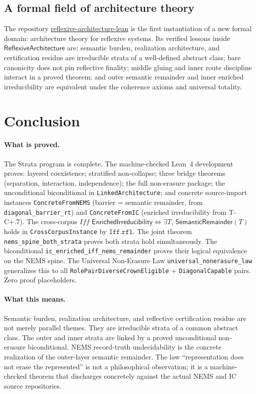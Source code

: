 \documentclass[11pt]{article}
\newcommand{\SemRem}{\ensuremath{\mathsf{SemanticRemainder}}}
\newcommand{\RAL}{\ensuremath{\mathsf{ReflexiveArchitecture}}}
\newcommand{\EnrIrr}{\ensuremath{\mathsf{EnrichedIrreducibility}}}
\begin{document}
\subsection{A formal field of architecture theory}

The repository \url{reflexive-architecture-lean} is the first instantiation of a new
formal domain: architecture theory for reflexive systems.  Its verified lessons inside
$\RAL$ are: semantic burden, realization architecture, and certification residue are
irreducible strata of a well-defined abstract class; bare canonicity does not pin
reflective finality; middle gluing and inner route discipline interact in a proved
theorem; and outer semantic remainder and inner enriched irreducibility are equivalent
under the coherence axioms and universal totality.

\section{Conclusion}
\label{sec:conclusion}

\paragraph{What is proved.}
The Strata program is complete.  The machine-checked Lean~4 development proves:
layered coexistence; stratified non-collapse; three bridge theorems (separation,
interaction, independence); the full non-erasure package; the unconditional
biconditional in \texttt{LinkedArchitecture}; and concrete source-import instances
\texttt{ConcreteFromNEMS} (barrier = semantic remainder, from \texttt{diagonal\_barrier\_rt})
and \texttt{ConcreteFromIC} (enriched irreducibility from T-C+.7).
The cross-corpus $\mathit{Iff}$
$\EnrIrr \iff \exists T,\,\SemRem(T)$
holds in \texttt{CrossCorpusInstance} by $\mathtt{Iff.rfl}$.
The joint theorem \texttt{nems\_spine\_both\_strata} proves both strata hold
simultaneously.  The biconditional \texttt{ic\_enriched\_iff\_nems\_remainder} proves
their logical equivalence on the NEMS spine.  The Universal Non-Erasure Law
\texttt{universal\_nonerasure\_law} generalizes this to all
\texttt{RolePairDiverseCrownEligible} + \texttt{DiagonalCapable} pairs.
Zero proof placeholders.

\paragraph{What this means.}
Semantic burden, realization architecture, and reflective certification residue are not
merely parallel themes.  They are irreducible strata of a common abstract class.  The
outer and inner strata are linked by a proved unconditional non-erasure biconditional.
NEMS record-truth undecidability is the concrete realization of the outer-layer semantic
remainder.  The law ``representation does not erase the represented'' is not a
philosophical observation; it is a machine-checked theorem that discharges concretely
against the actual NEMS and IC source repositories.
\end{document}
